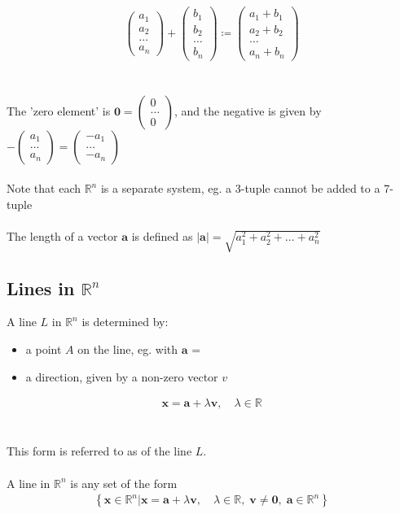 \documentclass{report}
\newcommand{\cvec}[1]{ \begin{pmatrix} #1 \end{pmatrix} }
\begin{document}
		\begin{align*}
			\begin{pmatrix}a_1\\a_2\\\dots\\a_n\end{pmatrix} + \begin{pmatrix}b_1\\b_2\\\dots\\b_n\end{pmatrix} \coloneq \cvec{a_1+b_1\\a_2+b_2\\\dots\\a_n+b_n}
		\end{align*}
		\\ \\
		The 'zero element' is $\mathbf{0} = \cvec{0\\\dots\\0}$, and the negative is given by $-\cvec{a_1\\\dots\\a_n} = \cvec{-a_1\\\dots\\-a_n}$
		\\ \\
		Note that each $\mathbb{R}^n$ is a separate system, eg. a 3-tuple cannot be added to a 7-tuple
		\\ \\
		The length of a vector $\mathbf{a}$ is defined as $|\mathbf{a}| = \sqrt{a_1^2 + a_2^2 + \dots + a_n^2}$

	\subsection{Lines in $\mathbb{R}^n$}

		A line $L$ in $\mathbb{R}^n$ is determined by:
			\begin{itemize}
				\item a point $A$ on the line, eg. with $\mathbf{a}$ = 
				\item a direction, given by a non-zero vector $v$
			\end{itemize}

		\begin{align*}
			\mathbf{x} = \mathbf{a} + \lambda \mathbf{v}, \quad \lambda \in \mathbb{R}
		\end{align*}
		\\ \\
		This form is referred to as  of the line $L$.
		\\ \\
		A line in $\mathbb{R}^n$ is any set of the form
		\begin{align*}
			\left\{ \mathbf{x} \in \mathbb{R}^n | \mathbf{x} = \mathbf{a} + \lambda \mathbf{v}, \quad \lambda \in \mathbb{R} ,\; \mathbf{v} \neq \mathbf{0},\; \mathbf{a} \in \mathbb{R}^n \right\}
		\end{align*}
\end{document}
